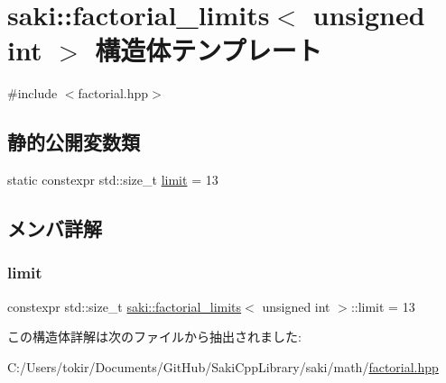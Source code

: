 \hypertarget{structsaki_1_1factorial__limits_3_01unsigned_01int_01_4}{}\section{saki\+:\+:factorial\+\_\+limits$<$ unsigned int $>$ 構造体テンプレート}
\label{structsaki_1_1factorial__limits_3_01unsigned_01int_01_4}


{\ttfamily \#include $<$factorial.\+hpp$>$}

\subsection*{静的公開変数類}
\begin{DoxyCompactItemize}
\item 
static constexpr std\+::size\+\_\+t \mbox{\hyperlink{structsaki_1_1factorial__limits_3_01unsigned_01int_01_4_a7dae8b98f0664b63cdf0230cd545ce59}{limit}} = 13
\end{DoxyCompactItemize}


\subsection{メンバ詳解}
\mbox{\label{structsaki_1_1factorial__limits_3_01unsigned_01int_01_4_a7dae8b98f0664b63cdf0230cd545ce59}} 
\subsubsection{\texorpdfstring{limit}{limit}}
{\footnotesize\ttfamily constexpr std\+::size\+\_\+t \mbox{\hyperlink{structsaki_1_1factorial__limits}{saki\+::factorial\+\_\+limits}}$<$ unsigned int $>$\+::limit = 13\hspace{0.3cm}{\ttfamily [static]}}



この構造体詳解は次のファイルから抽出されました\+:\begin{DoxyCompactItemize}
\item 
C\+:/\+Users/tokir/\+Documents/\+Git\+Hub/\+Saki\+Cpp\+Library/saki/math/\mbox{\hyperlink{factorial_8hpp}{factorial.\+hpp}}\end{DoxyCompactItemize}
